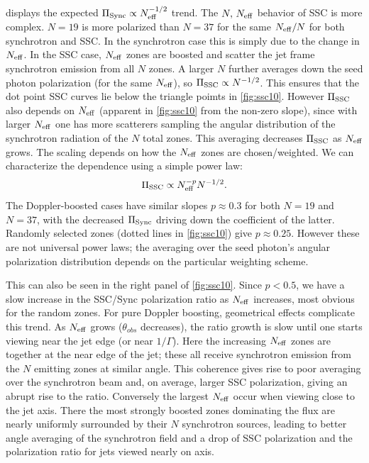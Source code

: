  displays the expected $\Pi_{\rm Sync} \propto N_{\rm eff}^{-1/2}$ trend. The $N,\, N_{\rm eff}$ behavior of SSC is more complex. $N=19$ is more polarized than $N=37$ for the same $N_{\rm eff}/N$ for both synchrotron and SSC. In the synchrotron case this is simply due to the change in $N_{\rm eff}$. In the SSC case, $N_{\rm eff}$ zones are boosted and scatter the jet frame synchrotron emission from all $N$ zones. A larger $N$ further averages down the seed photon polarization (for the same $N_{\rm eff}$), so $\Pi_{\rm SSC} \propto N^{-1/2}$. This ensures that the dot point SSC curves lie below the triangle poimts in \cref{fig:ssc10}. However $\Pi_{\rm SSC}$ also depends on $N_{\rm eff}$ (apparent in \cref{fig:ssc10} from the non-zero slope), since with larger $N_{\rm eff}$ one has more scatterers sampling the angular distribution of the synchrotron radiation of the $N$ total zones. This averaging decreases $\Pi_{\rm SSC}$ as $N_{\rm eff}$ grows. The scaling depends on how the $N_{\rm eff}$ zones are chosen/weighted. We can characterize the dependence using a simple power law:
\begin{equation}
   \Pi_{\rm SSC} \propto N_{\rm eff}^{-p} N^{-1/2}.
\end{equation}
The Doppler-boosted cases have similar slopes $p\approx 0.3$ for both $N=19$ and $N=37$, with the decreased $\Pi_{\rm Sync}$ driving down the coefficient of the latter. Randomly selected zones (dotted lines in \cref{fig:ssc10}) give $p \approx 0.25$. However these are not universal power laws; the averaging over the seed photon's angular polarization distribution depends on the particular weighting scheme.

This can also be seen in the right panel of \cref{fig:ssc10}. Since $p<0.5$, we have a slow increase in the SSC/Sync polarization ratio as $N_{\rm eff}$ increases, most obvious for the random zones. For pure Doppler boosting, geometrical effects complicate this trend. As $N_{\rm eff}$ grows ($\theta_{obs}$ decreases), the ratio growth is slow until one starts viewing near the jet edge (or near $1/\Gamma$). Here the increasing $N_{\rm eff}$ zones are together at the near edge of the jet; these all receive synchrotron emission from the $N$ emitting zones at similar angle. This coherence gives rise to poor averaging over the synchrotron beam and, on average, larger SSC polarization, giving an abrupt rise to the ratio. Conversely the largest $N_{\rm eff}$ occur when viewing close to the jet axis. There the most strongly boosted zones dominating the flux are nearly uniformly surrounded by their $N$ synchrotron sources, leading to better angle averaging of the synchrotron field and a drop of SSC polarization and the polarization ratio for jets viewed nearly on axis.

